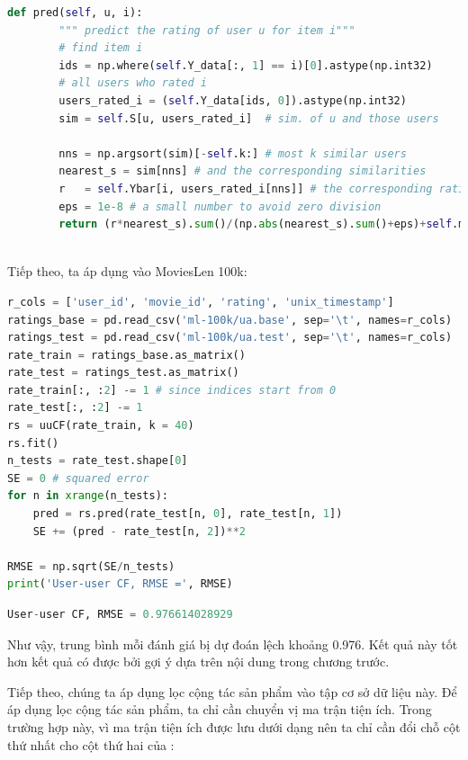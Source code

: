 \begin{lstlisting}[language=Python]
    def pred(self, u, i):
        """ predict the rating of user u for item i"""
        # find item i 
        ids = np.where(self.Y_data[:, 1] == i)[0].astype(np.int32) 
        # all users who rated i
        users_rated_i = (self.Y_data[ids, 0]).astype(np.int32) 
        sim = self.S[u, users_rated_i]  # sim. of u and those users
        
        nns = np.argsort(sim)[-self.k:] # most k similar users 
        nearest_s = sim[nns] # and the corresponding similarities        
        r   = self.Ybar[i, users_rated_i[nns]] # the corresponding ratings 
        eps = 1e-8 # a small number to avoid zero division 
        return (r*nearest_s).sum()/(np.abs(nearest_s).sum()+eps)+self.mu[u]
    
\end{lstlisting}

Tiếp theo, ta áp dụng vào MoviesLen 100k:
\begin{lstlisting}[language=Python]
r_cols = ['user_id', 'movie_id', 'rating', 'unix_timestamp']
ratings_base = pd.read_csv('ml-100k/ua.base', sep='\t', names=r_cols)
ratings_test = pd.read_csv('ml-100k/ua.test', sep='\t', names=r_cols)
rate_train = ratings_base.as_matrix()
rate_test = ratings_test.as_matrix()
rate_train[:, :2] -= 1 # since indices start from 0
rate_test[:, :2] -= 1
rs = uuCF(rate_train, k = 40)
rs.fit()
n_tests = rate_test.shape[0]
SE = 0 # squared error
for n in xrange(n_tests):
    pred = rs.pred(rate_test[n, 0], rate_test[n, 1])
    SE += (pred - rate_test[n, 2])**2 

RMSE = np.sqrt(SE/n_tests)
print('User-user CF, RMSE =', RMSE)
\end{lstlisting}
\kq
\begin{lstlisting}[language=Python]
User-user CF, RMSE = 0.976614028929
\end{lstlisting}

Như vậy, trung bình mỗi đánh giá bị dự đoán lệch khoảng 0.976. Kết quả này tốt hơn kết quả có được bởi gợi ý dựa trên nội dung trong chương trước. 

Tiếp theo, chúng ta áp dụng lọc cộng tác sản phẩm vào tập cơ sở dữ
liệu này. Để áp dụng lọc cộng tác sản phẩm, ta chỉ cần chuyển vị ma trận tiện ích. Trong trường hợp này, vì ma trận tiện ích được lưu dưới dạng
 nên ta chỉ cần đổi chỗ cột thứ nhất
cho cột thứ hai của :

